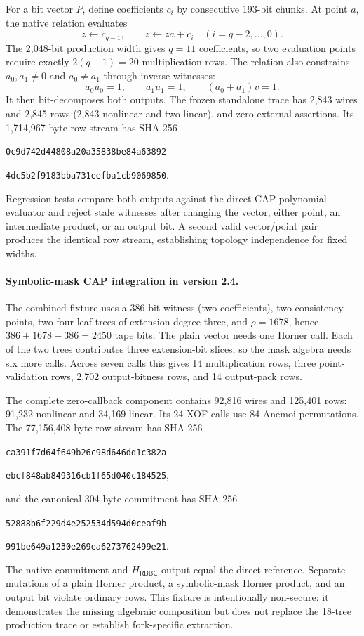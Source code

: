 \documentclass[11pt]{article}
\newcommand{\RBBC}{\mathsf{RBBC}}
\begin{document}
For a bit vector $P$, define coefficients $c_i$ by consecutive 193-bit
chunks.  At point $a$, the native relation evaluates
\[
 z\leftarrow c_{q-1},\qquad
 z\leftarrow z a+c_i\quad(i=q-2,\ldots,0).
\]
The 2,048-bit production width gives $q=11$ coefficients, so two evaluation
points require exactly $2(q-1)=20$ multiplication rows.  The relation also
constrains $a_0,a_1\neq0$ and $a_0\neq a_1$ through inverse witnesses:
\[
 a_0u_0=1,\qquad a_1u_1=1,\qquad(a_0+a_1)v=1.
\]
It then bit-decomposes both outputs.  The frozen standalone trace has 2,843
wires and 2,845 rows (2,843 nonlinear and two linear), and zero external
assertions.  Its 1,714,967-byte row stream has SHA-256
\begin{center}
\texttt{0c9d742d44808a20a35838be84a63892}\par\vspace{-0.2em}
\texttt{4dc5b2f9183bba731eefba1cb9069850}.
\end{center}
Regression tests compare both outputs against the direct CAP polynomial
evaluator and reject stale witnesses after changing the vector, either point,
an intermediate product, or an output bit.  A second valid vector/point pair
produces the identical row stream, establishing topology independence for
fixed widths.

\paragraph{Symbolic-mask CAP integration in version 2.4.}
The combined fixture uses a 386-bit witness (two coefficients), two consistency
points, two four-leaf trees of extension degree three, and
$\rho=1678$, hence $386+1678+386=2450$ tape bits.  The plain vector needs one
Horner call.  Each of the two trees contributes three extension-bit slices,
so the mask algebra needs six more calls.  Across seven calls this gives 14
multiplication rows, three point-validation rows, 2,702 output-bitness rows,
and 14 output-pack rows.

The complete zero-callback component contains 92,816 wires and 125,401 rows:
91,232 nonlinear and 34,169 linear.  Its 24 XOF calls use 84 Anemoi
permutations.  The 77,156,408-byte row stream has SHA-256
\begin{center}
\texttt{ca391f7d64f649b26c98d646dd1c382a}\par\vspace{-0.2em}
\texttt{ebcf848ab849316cb1f65d040c184525},
\end{center}
and the canonical 304-byte commitment has SHA-256
\begin{center}
\texttt{52888b6f229d4e252534d594d0ceaf9b}\par\vspace{-0.2em}
\texttt{991be649a1230e269ea6273762499e21}.
\end{center}
The native commitment and $H_{\RBBC}$ output equal the direct reference.
Separate mutations of a plain Horner product, a symbolic-mask Horner product,
and an output bit violate ordinary rows.  This fixture is intentionally
non-secure: it demonstrates the missing algebraic composition but does not
replace the 18-tree production trace or establish fork-specific extraction.
\end{document}
